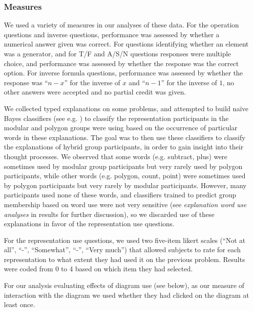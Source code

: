 \documentclass[man,10pt]{apa6}
\begin{document}
\subsubsection{Measures}
We used a variety of measures in our analyses of these data. For the operation questions and inverse questions, performance was assessed by whether a numerical answer given was correct. For questions identifying whether an element was a generator, and for T/F and A/S/N questions responses were multiple choice, and performance was assessed by whether the response was the correct option. For inverse formula questions, performance was assessed by whether the response was ``$n-x$'' for the inverse of $x$ and ``$n-1$'' for the inverse of $1$, no other answers were accepted and no partial credit was given.\par
We collected typed explanations on some problems, and attempted to build na{\"i}ve Bayes classifiers (see e.g. \cite{Ng2002}) to classify the representation participants in the modular and polygon groups were using based on the occurrence of particular words in these explanations. The goal was to then use these classifiers to classify the explanations of hybrid group participants, in order to gain insight into their thought processes. We observed that some words (e.g. subtract, plus) were sometimes used by modular group participants but very rarely used by polygon participants, while other words (e.g. polygon, count, point) were sometimes used by polygon participants but very rarely by modular participants. However, many participants used none of these words, and classifiers trained to predict group membership based on word use were not very sensitive (see \emph{explanation word use analyses} in results for further discussion), so we discarded use of these explanations in favor of the representation use questions. \par
For the representation use questions, we used two five-item likert scales (``Not at all'', ``-'', ``Somewhat'', ``-'', ``Very much'') that allowed subjects to rate for each representation to what extent they had used it on the previous problem. Results were coded from 0 to 4 based on which item they had selected. \par
For our analysis evaluating effects of diagram use (see below), as our measure of interaction with the diagram we used whether they had clicked on the diagram at least once. 
\end{document}
